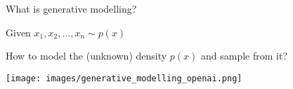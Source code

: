 

\begin{frame}{What is generative modelling?}

Given $x_1, x_2, \ldots, x_n \sim p(x)$

How to model the (unknown) density $p(x)$ and sample from it?

\texttt{[image: images/generative\_modelling\_openai.png]}

\end{frame}



    

        
